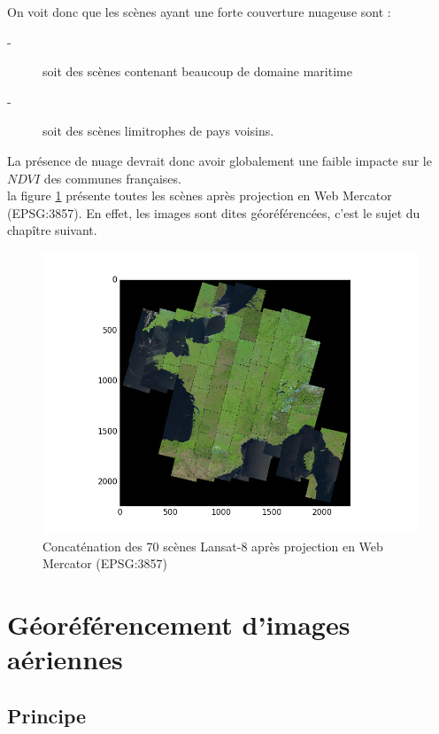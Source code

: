 \documentclass{book}
\begin{document}
On voit donc que les scènes ayant une forte couverture nuageuse sont :
\begin{description}
\item[-] soit des scènes contenant beaucoup de domaine maritime
\item[-] soit des scènes limitrophes de pays voisins. 
\end{description}
La présence de nuage devrait donc avoir globalement une faible impacte sur le $NDVI$ des communes françaises.\\

la figure \ref{couverture} présente toutes les scènes après projection en Web Mercator (EPSG:3857). En effet, les images sont dites géoréférencées, c'est le 
sujet du chapître suivant.

\begin{figure}[H]
\begin{center}
\includegraphics[scale=0.7]{images/france-covering.png}
\end{center}
\caption{Concaténation des 70 scènes Lansat-8 après projection en Web Mercator (EPSG:3857)}
\label{couverture}
\end{figure}


\chapter{Géoréférencement d'images aériennes}
\section{Principe}\label{principe_geo}
\end{document}
